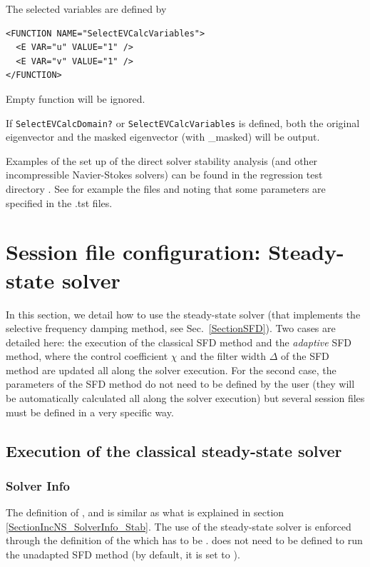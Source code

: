The selected variables are defined by
\begin{lstlisting}[style=XMLStyle]
<FUNCTION NAME="SelectEVCalcVariables">
  <E VAR="u" VALUE="1" />
  <E VAR="v" VALUE="1" />
</FUNCTION>
\end{lstlisting}
Empty function will be ignored.

If \texttt{SelectEVCalcDomain?} or \texttt{SelectEVCalcVariables} is defined, both the original eigenvector and the masked eigenvector (with \_masked) will be output.


\begin{notebox}
Examples of the set up of the direct solver stability analysis (and
other incompressible Navier-Stokes solvers) can be found in the
regression test directory
. See for example the files
 and 
noting that some parameters are specified in the .tst files.
\end{notebox}

\section{Session file configuration: Steady-state solver}
\label{SectionSFD_XML}

In this section, we detail how to use the steady-state solver (that
implements the selective frequency damping method, see
Sec.~\ref{SectionSFD}).  Two cases are detailed here: the execution of
the classical SFD method and the \textit{adaptive} SFD method, where
the control coefficient $\chi$ and the filter width $\Delta$ of the
SFD method are updated all along the solver execution. For the second
case, the parameters of the SFD method do not need to be defined by
the user (they will be automatically calculated all along the solver
execution) but several session files must be defined in a very
specific way.

\subsection{Execution of the classical steady-state solver}

\subsubsection{Solver Info}

The definition of ,  and
 is similar as what is explained in section~
\ref{SectionIncNS_SolverInfo_Stab}. The use of the steady-state solver
is enforced through the definition of the  which has to be
.  does not need to be
defined to run the unadapted SFD method (by default, it is set to
).

